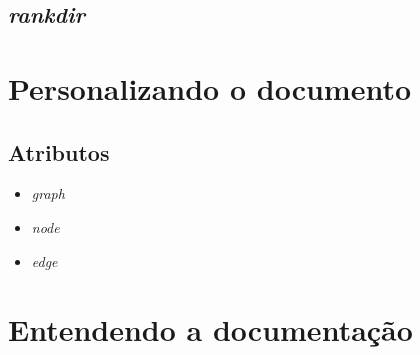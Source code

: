 \documentclass[a4paper,12pt]{article}
\begin{document}
    \subsection{\emph{rankdir}}
    \break

  \section{Personalizando o documento}

    \subsection{Atributos}

      \begin{itemize}
        \item{\emph{graph}}

        \item{\emph{node}}

        \item{\emph{edge}}
      \end{itemize}

  \section{Entendendo a documentação}
\end{document}
